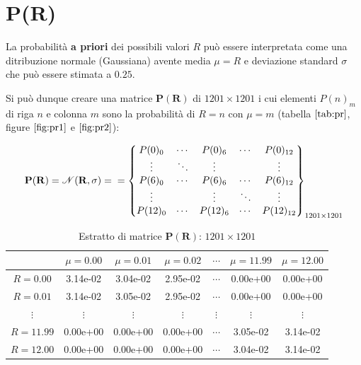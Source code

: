 \documentclass[11pt]{article}
\begin{document}
    
    \hypertarget{pr}{%
\section{P(R)}\label{pr}}

    La probabilità \textbf{a priori} dei possibili valori \(R\) può essere
interpretata come una ditribuzione normale (Gaussiana) avente media
\(\mu = R\) e deviazione standard \(\sigma\) che può essere stimata a
\(0.25\).

Si può dunque creare una matrice \(\mathbf{P(R)}\) di
\(1201 \times 1201\) i cui elementi \(P(n)_m\) di riga \(n\) e colonna
\(m\) sono la probabilità di \(R=n\) con \(\mu=m\) (tabella
\(\ref{tab:pr}\), figure \(\ref{fig:pr1}\) e \(\ref{fig:pr2}\)):

    \begin{equation}\label{eq:pr}
\mathbf{P(R)} = \mathbf{\mathscr{N}(R,\sigma)} = \\
= 
\begin{Bmatrix}
P(0)_{0} & \cdots & P(0)_{6} & \cdots  & P(0)_{12} \\ 
\vdots & \ddots & \vdots & & \vdots \\
P(6)_{0} & \cdots & P(6)_{6} & \cdots & P(6)_{12} \\ 
\vdots & & \vdots & \ddots & \vdots \\
P(12)_{0} & \cdots & P(12)_{6} & \cdots & P(12)_{12}
\end{Bmatrix}_{1201 \times 1201}
\end{equation}

    
\begin{table}
  \begin{center}
    \caption{Estratto di matrice $\mathbf{P(R)}$: $1201 \times 1201$}
    \label{tab:pr}
    \begin{tabular}{c|c|c|c|c|c|c|}
          & $\mu=0.00$ &$\mu=0.01$ & $\mu=0.02$ & $\cdots$ & $\mu=11.99$ & $\mu=12.00$ \\
        \toprule
        $R=0.00$ & 3.14e-02 & 3.04e-02 & 2.95e-02 & $\cdots$ & 0.00e+00 & 0.00e+00 \\
        \midrule
        $R=0.01$ & 3.14e-02 & 3.05e-02 & 2.95e-02 & $\cdots$ & 0.00e+00 & 0.00e+00 \\
        \midrule
        $\vdots$ & $\vdots$ & $\vdots$ & $\vdots$ & $\vdots$ & $\vdots$ & $\vdots$ \\
        \midrule
        $R=11.99$ & 0.00e+00 & 0.00e+00 & 0.00e+00 & $\cdots$ & 3.05e-02 & 3.14e-02 \\
        \midrule
        $R=12.00$ & 0.00e+00 & 0.00e+00 & 0.00e+00 & $\cdots$ & 3.04e-02 & 3.14e-02 \\
        \bottomrule
    \end{tabular}
  \end{center}
\end{table}
        
\end{document}
